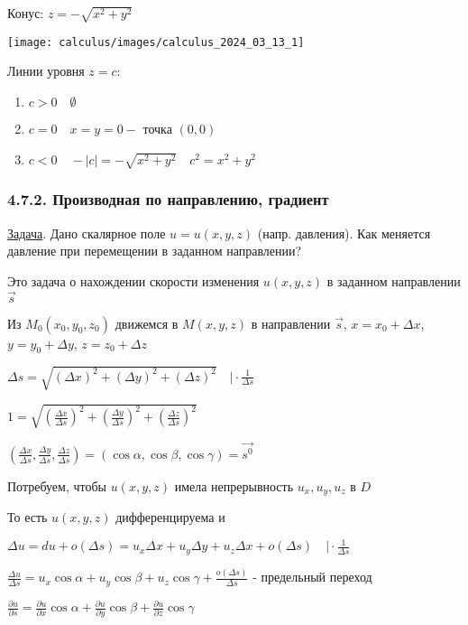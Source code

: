 \documentclass[12pt]{article}
\begin{document}
    \Ex Конус: $z = -\sqrt{x^2 + y^2}$

    \texttt{[image: calculus/images/calculus\_2024\_03\_13\_1]}

    Линии уровня $z = c$:

    \begin{enumerate}
        \item $c > 0 \quad \emptyset$
        \item $c = 0 \quad x = y = 0 - $ точка $(0, 0)$
        \item $c < 0 \quad -|c| = -\sqrt{x^2 + y^2} \quad c^2 = x^2 + y^2$
    \end{enumerate}


    \subsubsection{4.7.2. Производная по направлению, градиент}

    \underline{Задача}. Дано скалярное поле $u = u(x, y, z)$ (напр. давления). Как меняется давление при перемещении в заданном направлении?

    Это задача о нахождении скорости изменения $u(x, y, z)$ в заданном направлении $\vec{s}$

    Из $M_0(x_0, y_0, z_0)$ движемся в $M(x, y, z)$ в направлении $\vec{s}$, $x = x_0 + \Delta x$, $y = y_0 + \Delta y$, $z = z_0 + \Delta z$

    $\Delta s = \sqrt{(\Delta x)^2 + (\Delta y)^2 + (\Delta z)^2} \quad \Big| \cdot \frac{1}{\Delta s}$

    $1 = \sqrt{\left(\frac{\Delta x}{\Delta s}\right)^2 + \left(\frac{\Delta y}{\Delta s}\right)^2 + \left(\frac{\Delta z}{\Delta s}\right)^2}$

    $(\frac{\Delta x}{\Delta s}, \frac{\Delta y}{\Delta s}, \frac{\Delta z}{\Delta s}) = (\cos\alpha, \cos\beta, \cos\gamma) = \overrightarrow{s^0}$

    Потребуем, чтобы $u(x, y, z)$ имела непрерывность $u_x, u_y, u_z$ в $D$

    То есть $u(x, y, z)$ дифференцируема и

    $\Delta u = du + o(\Delta s) = u_x \Delta x + u_y \Delta y + u_z \Delta x + o(\Delta s) \quad \Big| \cdot \frac{1}{\Delta s}$

    $\frac{\Delta u}{\Delta s} = u_x \cos\alpha + u_y \cos\beta + u_z \cos\gamma + \frac{o(\Delta s)}{\Delta s}$ - предельный переход

    $\frac{\partial u}{\partial s} = \frac{\partial u}{\partial x} \cos\alpha + \frac{\partial u}{\partial y} \cos\beta + \frac{\partial u}{\partial z} \cos\gamma$
\end{document}
